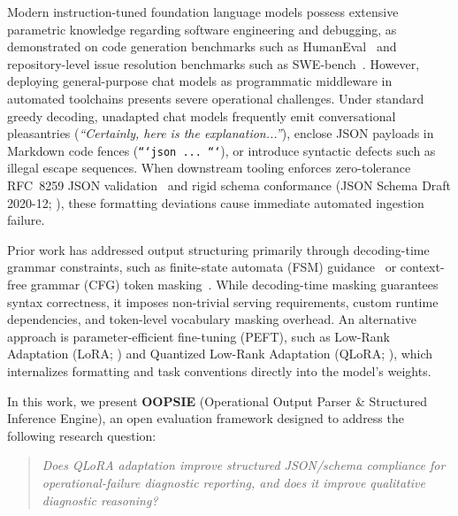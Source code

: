\documentclass[11pt,a4paper]{article}
\begin{document}
Modern instruction-tuned foundation language models possess extensive parametric knowledge regarding software engineering and debugging, as demonstrated on code generation benchmarks such as HumanEval~\cite{chen2021codex} and repository-level issue resolution benchmarks such as SWE-bench~\cite{jimenez2024swebench}. However, deploying general-purpose chat models as programmatic middleware in automated toolchains presents severe operational challenges. Under standard greedy decoding, unadapted chat models frequently emit conversational pleasantries (\textit{``Certainly, here is the explanation...''}), enclose JSON payloads in Markdown code fences (\texttt{```json ... ```}), or introduce syntactic defects such as illegal escape sequences. When downstream tooling enforces zero-tolerance RFC~8259 JSON validation~\cite{rfc8259} and rigid schema conformance (JSON Schema Draft 2020-12; \cite{wright2022core,wright2022validation}), these formatting deviations cause immediate automated ingestion failure.

Prior work has addressed output structuring primarily through decoding-time grammar constraints, such as finite-state automata (FSM) guidance~\cite{willard2023guided} or context-free grammar (CFG) token masking~\cite{ugare2025syncode}. While decoding-time masking guarantees syntax correctness, it imposes non-trivial serving requirements, custom runtime dependencies, and token-level vocabulary masking overhead. An alternative approach is parameter-efficient fine-tuning (PEFT), such as Low-Rank Adaptation (LoRA; \cite{hu2022lora}) and Quantized Low-Rank Adaptation (QLoRA; \cite{dettmers2023qlora}), which internalizes formatting and task conventions directly into the model's weights.

In this work, we present \textbf{OOPSIE} (Operational Output Parser \& Structured Inference Engine), an open evaluation framework designed to address the following research question:
\begin{quote}\sloppy
\textit{Does QLoRA adaptation improve structured JSON/schema compliance for operational-failure diagnostic reporting, and does it improve qualitative diagnostic reasoning?}
\end{quote}
\end{document}
